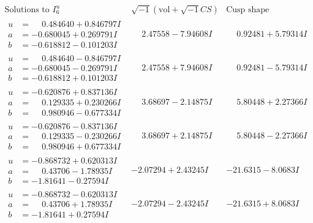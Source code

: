 \documentclass[1p]{elsarticle_modified}
\theoremstyle{definition}
\newcommand{\I}{\sqrt{-1}}
\begin{document}
$$\begin{array}{c|c|c}  
\text{Solutions to }I^u_{6}& \I (\text{vol} + \sqrt{-1}CS) & \text{Cusp shape}\\
 \hline 
\begin{aligned}
u &= \phantom{-}0.484640 + 0.846797 I \\
a &= -0.680045 + 0.269791 I \\
b &= -0.618812 - 0.101203 I\end{aligned}
 & \phantom{-}2.47558 - 7.94608 I & \phantom{-}0.92481 + 5.79314 I \\ \hline\begin{aligned}
u &= \phantom{-}0.484640 - 0.846797 I \\
a &= -0.680045 - 0.269791 I \\
b &= -0.618812 + 0.101203 I\end{aligned}
 & \phantom{-}2.47558 + 7.94608 I & \phantom{-}0.92481 - 5.79314 I \\ \hline\begin{aligned}
u &= -0.620876 + 0.837136 I \\
a &= \phantom{-}0.129335 + 0.230266 I \\
b &= \phantom{-}0.980946 - 0.677334 I\end{aligned}
 & \phantom{-}3.68697 - 2.14875 I & \phantom{-}5.80448 + 2.27366 I \\ \hline\begin{aligned}
u &= -0.620876 - 0.837136 I \\
a &= \phantom{-}0.129335 - 0.230266 I \\
b &= \phantom{-}0.980946 + 0.677334 I\end{aligned}
 & \phantom{-}3.68697 + 2.14875 I & \phantom{-}5.80448 - 2.27366 I \\ \hline\begin{aligned}
u &= -0.868732 + 0.620313 I \\
a &= \phantom{-}0.43706 - 1.78935 I \\
b &= -1.81641 - 0.27594 I\end{aligned}
 & -2.07294 + 2.43245 I & -21.6315 - 8.0683 I \\ \hline\begin{aligned}
u &= -0.868732 - 0.620313 I \\
a &= \phantom{-}0.43706 + 1.78935 I \\
b &= -1.81641 + 0.27594 I\end{aligned}
 & -2.07294 - 2.43245 I & -21.6315 + 8.0683 I \\ \hline\begin{aligned}

\end{aligned}
\end{array}$$
\end{document}
